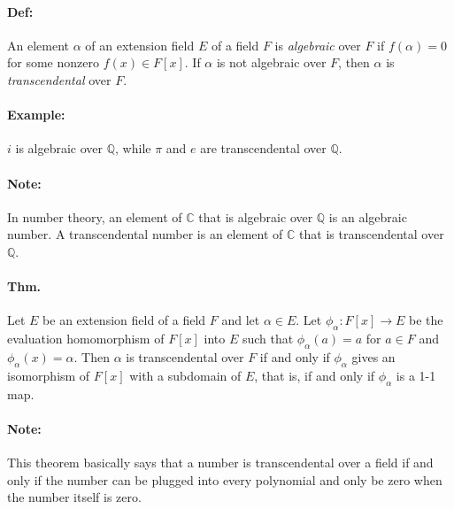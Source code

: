 \documentclass[10pt,a4paper]{article}
\begin{document}
\paragraph{Def:} An element $\alpha$ of an extension field $E$ of a field $F$ is \textit{algebraic} over $F$ if $f(\alpha) = 0$ for some nonzero $f(x) \in F[x]$. If $\alpha$ is not algebraic over $F$, then $\alpha$ is \textit{transcendental} over $F$.

\paragraph{Example:} $i$ is algebraic over $\mathbb{Q}$, while $\pi$ and $e$ are transcendental over $\mathbb{Q}$.

\paragraph{Note:} In number theory, an element of $\mathbb{C}$ that is algebraic over $\mathbb{Q}$ is an algebraic number. A transcendental number is an element of $\mathbb{C}$ that is transcendental over $\mathbb{Q}$.

\paragraph{Thm.} Let $E$ be an extension field of a field $F$ and let $\alpha \in E$. Let $\phi_\alpha: F[x] \to E$ be the evaluation homomorphism of $F[x]$ into $E$ such that $\phi_\alpha(a) = a$ for $a \in F$ and $\phi_\alpha(x) = \alpha$. Then $\alpha$ is transcendental over $F$ if and only if $\phi_\alpha$ gives an isomorphism of $F[x]$ with a subdomain of $E$, that is, if and only if $\phi_\alpha$ is a 1-1 map.

\paragraph{Note:} This theorem basically says that a number is transcendental over a field if and only if the number can be plugged into every polynomial and only be zero when the number itself is zero.
\end{document}
